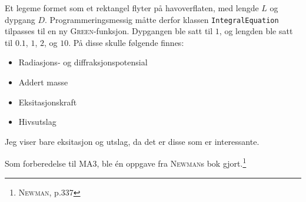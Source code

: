 Et legeme formet som et rektangel flyter på havoverflaten, med lengde $L$ og dypgang $D$.
Programmeringsmessig måtte derfor klassen \texttt{IntegralEquation} tilpasses til en ny \textsc{Green}-funksjon.
Dypgangen ble satt til $1$, og lengden ble satt til $0.1$, $1$, $2$, og $10$.
På disse skulle følgende finnes:
\begin{itemize}
\item Radiasjons- og diffraksjonspotensial
\item Addert masse
\item Eksitasjonskraft
\item Hivsutslag
\end{itemize}
Jeg viser bare eksitasjon og utslag, da det er disse som er interessante.

\vspace{2em}
Som forberedelse til MA3, ble \'{e}n oppgave fra \textsc{Newman}s bok gjort.\footnote{\cite{newman2018marine} \textsc{Newman}, p.337}
